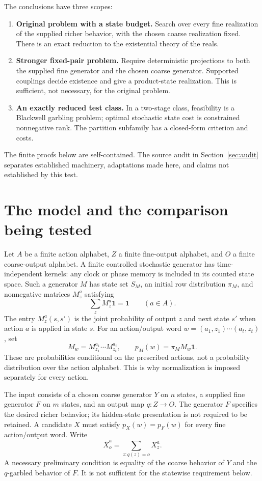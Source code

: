 \documentclass[11pt]{article}
\newcommand{\one}{\mathbf{1}}
\begin{document}
The conclusions have three scopes:
\begin{enumerate}
\item \textbf{Original problem with a state budget.} Search over every fine realization of the supplied richer behavior, with the chosen coarse realization fixed. There is an exact reduction to the existential theory of the reals.
\item \textbf{Stronger fixed-pair problem.} Require deterministic projections to both the supplied fine generator and the chosen coarse generator. Supported couplings decide existence and give a product-state realization. This is sufficient, not necessary, for the original problem.
\item \textbf{An exactly reduced test class.} In a two-stage class, feasibility is a Blackwell garbling problem; optimal stochastic state cost is constrained nonnegative rank. The partition subfamily has a closed-form criterion and costs.
\end{enumerate}
The finite proofs below are self-contained. The source audit in Section~\ref{sec:audit} separates established machinery, adaptations made here, and claims not established by this test.

\section{The model and the comparison being tested}
\label{sec:model}

Let $A$ be a finite action alphabet, $Z$ a finite fine-output alphabet, and $O$ a finite coarse-output alphabet. A finite controlled stochastic generator has time-independent kernels: any clock or phase memory is included in its counted state space. Such a generator $M$ has state set $S_M$, an initial row distribution $\pi_M$, and nonnegative matrices $M_z^a$ satisfying
\begin{equation}
 \sum_z M_z^a\one=\one \qquad(a\in A).
 \label{eq:normalization}
\end{equation}
The entry $M_z^a(s,s')$ is the joint probability of output $z$ and next state $s'$ when action $a$ is applied in state $s$. For an action/output word $w=(a_1,z_1)\cdots(a_t,z_t)$, set
\[
 M_w=M_{z_1}^{a_1}\cdots M_{z_t}^{a_t},
 \qquad p_M(w)=\pi_M M_w\one.
\]
These are probabilities conditional on the prescribed actions, not a probability distribution over the action alphabet. This is why normalization is imposed separately for every action.

The input consists of a chosen coarse generator $Y$ on $n$ states, a supplied fine generator $F$ on $m$ states, and an output map $q:Z\to O$. The generator $F$ specifies the desired richer behavior; its hidden-state presentation is not required to be retained. A candidate $X$ must satisfy $p_X(w)=p_F(w)$ for every fine action/output word. Write
\[
 \overline X_o^a=\sum_{z:q(z)=o}X_z^a.
\]
A necessary preliminary condition is equality of the coarse behavior of $Y$ and the $q$-garbled behavior of $F$. It is not sufficient for the statewise requirement below.
\end{document}
